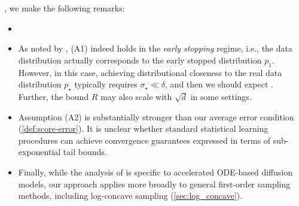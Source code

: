 , we make the following remarks:
\begin{itemize}
\item {}

\item As noted by \citet{gatmiry2026high}, (A1) indeed holds in the \emph{early stopping} regime, i.e., the data distribution actually corresponds to the early stopped distribution $p_1$. However, in this case, achieving distributional closeness to the real data distribution $p_\star$ typically requires $\sigma_\star \ll \delta$, and then we should expect . Further, the bound $R$ may also scale with $\sqrt{d}$ in some settings.
\item Assumption (A2) is substantially stronger than our average error condition (\cref{def:score-error}). It is unclear whether standard statistical learning procedures can achieve convergence guarantees expressed in terms of sub-exponential tail bounds.
\item Finally, while the analysis of \citet{gatmiry2026high} is specific to accelerated ODE-based diffusion models, our approach applies more broadly to general first-order sampling methods, including log-concave sampling (\cref{sec:log_concave}).
\end{itemize}

